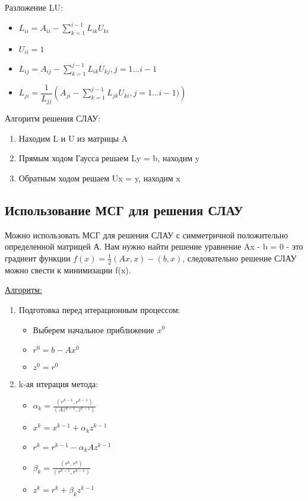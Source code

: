 \documentclass[a4paper,12pt]{article}
\begin{document}
Разложение LU:
\begin{itemize}
    \item $L_{ii} = A_{ii} - \sum\limits_{k = 1}^{i - 1} L_{ik}U_{ki}$
    \item $U_{ii} = 1$
    \item $L_{ij} = A_{ij} - \sum\limits_{k = 1}^{j - 1} L_{ik}U_{kj}, j = 1\dots i - 1$
    \item $L_{ji} = \dfrac{1}{L_{jj}}\left(A_{ji} - \sum\limits_{k = 1}^{j - 1} L_{jk}U_{ki}, j = 1\dots i - 1)\right)$
\end{itemize}
Алгоритм решения СЛАУ:
\begin{enumerate}
    \item Находим L и U из матрицы A
    \item Прямым ходом Гаусса решаем Ly = b, находим y
    \item Обратным ходом решаем Ux = y, находим x
\end{enumerate}

\subsection{Использование МСГ для решения СЛАУ}

Можно использовать МСГ для решения СЛАУ с симметричной положительно определенной матрицей А. Нам нужно найти решение уравнение Ax - b = 0 - это градиент функции $f(x) = \frac{1}{2}\left(Ax, x\right) - \left(b, x\right)$, следовательно решение СЛАУ можно свести к минимизации f(x).

\underline{Алгоритм:}
\begin{enumerate}
    \item Подготовка перед итерационным процессом:
    \begin{itemize}
        \item Выберем начальное приближение $x^{0}$
        \item $r^{0} = b - Ax^{0}$
        \item $z^{0} = r^{0}$
    \end{itemize}
    \item k-ая итерация метода:
    \begin{itemize}
    \item ${\displaystyle \alpha _{k}={\frac {(r^{k-1},r^{k-1})}{(Az^{k-1},z^{k-1})}}}$
        \item $x^k = x^{k-1} + \alpha_k z^{k-1}$
        \item $r^k = r^{k-1} - \alpha_k A z^{k-1}$
        \item $\beta_k = \frac{(r^k, r^k)}{(r^{k-1}, r^{k-1})}$
        \item ${\displaystyle z^{k}=r^{k}+\beta _{k}z^{k-1}}$
    \end{itemize}
\end{enumerate}
\end{document}
